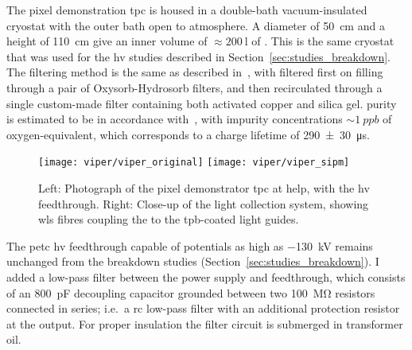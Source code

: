 The pixel demonstration \gls{tpc} is housed in a double-bath vacuum-insulated cryostat with the outer bath open to atmosphere.
A diameter of \SI{50}{\centi\metre} and a height of \SI{110}{\centi\metre} give an inner volume of $\approx \SI{200}{\litre}$ of \lar{}.
This is the same cryostat that was used for the \gls{hv} studies described in Section~\ref{sec:studies_breakdown}.
The \lar{} filtering method is the same as described in~\cite{2photonAbs}, with \lar{} filtered first on filling through a pair of Oxysorb-Hydrosorb filters, and then recirculated through a single custom-made filter containing both activated copper and silica gel.
\lar{} purity is estimated to be in accordance with~\cite{2photonAbs}, with impurity concentrations $\sim{\SI{1}{ppb}}$ of oxygen-equivalent, which corresponds to a charge lifetime of \SI{290+-30}{\micro\second}.

\begin{figure}[tbp]
	\centering
	\texttt{[image: viper/viper\_original]}
	\texttt{[image: viper/viper\_sipm]}
	\caption[Pixel demonstrator close-up]{%
		Left: Photograph of the  pixel demonstrator \acrshort{tpc} at \acrshort{help}, with the \acrshort{hv} feedthrough.
		Right: Close-up of the light collection system, showing \acrshort{wls} fibres coupling the  to the \acrshort{tpb}-coated light guides.
	}
	\label{fig:viper_v1per}
\end{figure}

The \gls{petc} \gls{hv} feedthrough capable of potentials as high as \SI{-130}{\kilo\volt} remains unchanged from the breakdown studies (Section~\ref{sec:studies_breakdown}).
I added a low-pass filter between the power supply and feedthrough, which consists of an \SI{800}{\pico\farad} decoupling capacitor grounded between two \SI{100}{\mega\ohm} resistors connected in series; i.e.\ a \gls{rc} low-pass filter with an additional protection resistor at the output.
For proper insulation the filter circuit is submerged in transformer oil.

